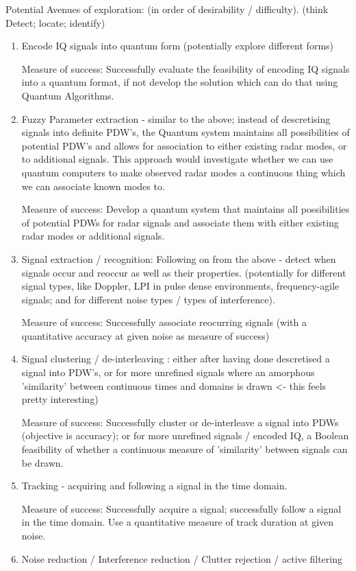 Potential Avenues of exploration: (in order of desirability / difficulty). (think Detect; locate; identify)
\begin{enumerate}
    \item Encode IQ signals into quantum form (potentially explore different forms)
    
    Measure of success: Successfully evaluate the feasibility of encoding IQ signals into a quantum format, if not develop the solution which can do that using Quantum Algorithms.
    
    \item Fuzzy Parameter extraction - similar to the above; instead of descretising signals into definite PDW's, the Quantum system maintains all possibilities of potential PDW's and allows for association to either existing radar modes, or to additional signals. This approach would investigate whether we can use quantum computers to make observed radar modes a continuous thing which we can associate known modes to.
    
    Measure of success: Develop a quantum system that maintains all possibilities of potential PDWs for radar signals and associate them with either existing radar modes or additional signals. 
    
    \item Signal extraction / recognition: Following on from the above - detect when signals occur and reoccur as well as their properties. (potentially for different signal types, like Doppler, LPI in pulse dense environments, frequency-agile signals; and for different noise types / types of interference).

    Measure of success: Successfully associate reocurring signals (with a quantitative accuracy at given noise as measure of success) 
    
    \item Signal clustering / de-interleaving : either after having done descretised a signal into PDW's, or for more unrefined signals where an amorphous 'similarity' between continuous times and domains is drawn <- this feels pretty interesting)

    Measure of success: Successfully cluster or de-interleave a signal into PDWs (objective is accuracy); or for more unrefined signals / encoded IQ, a Boolean feasibility of whether a continuous measure of 'similarity' between signals can be drawn.
    
    \item Tracking - acquiring and following a signal in the time domain.

    Measure of success: Successfully acquire a signal; successfully follow a signal in the time domain. Use a quantitative measure of track duration at given noise.
    
    \item Noise reduction / Interference reduction / Clutter rejection / active filtering
\end{enumerate}
